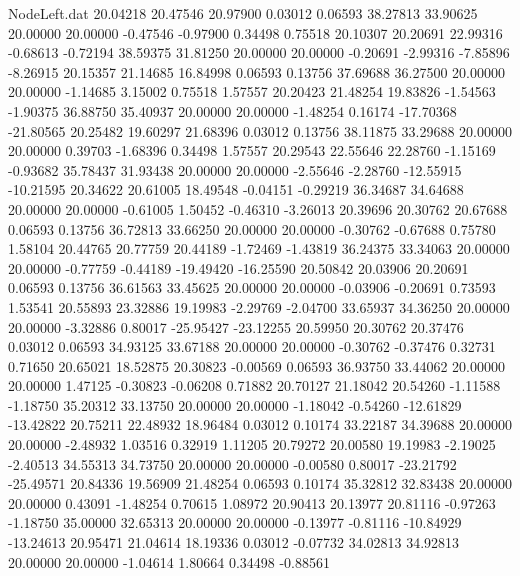 \begin{filecontents}{NodeLeft.dat}
  20.04218   20.47546   20.97900     0.03012    0.06593   38.27813   33.90625   20.00000   20.00000   -0.47546   -0.97900    0.34498    0.75518
  20.10307   20.20691   22.99316    -0.68613   -0.72194   38.59375   31.81250   20.00000   20.00000   -0.20691   -2.99316   -7.85896   -8.26915
  20.15357   21.14685   16.84998     0.06593    0.13756   37.69688   36.27500   20.00000   20.00000   -1.14685    3.15002    0.75518    1.57557
  20.20423   21.48254   19.83826    -1.54563   -1.90375   36.88750   35.40937   20.00000   20.00000   -1.48254    0.16174  -17.70368  -21.80565
  20.25482   19.60297   21.68396     0.03012    0.13756   38.11875   33.29688   20.00000   20.00000    0.39703   -1.68396    0.34498    1.57557
  20.29543   22.55646   22.28760    -1.15169   -0.93682   35.78437   31.93438   20.00000   20.00000   -2.55646   -2.28760  -12.55915  -10.21595
  20.34622   20.61005   18.49548    -0.04151   -0.29219   36.34687   34.64688   20.00000   20.00000   -0.61005    1.50452   -0.46310   -3.26013
  20.39696   20.30762   20.67688     0.06593    0.13756   36.72813   33.66250   20.00000   20.00000   -0.30762   -0.67688    0.75780    1.58104
  20.44765   20.77759   20.44189    -1.72469   -1.43819   36.24375   33.34063   20.00000   20.00000   -0.77759   -0.44189  -19.49420  -16.25590
  20.50842   20.03906   20.20691     0.06593    0.13756   36.61563   33.45625   20.00000   20.00000   -0.03906   -0.20691    0.73593    1.53541
  20.55893   23.32886   19.19983    -2.29769   -2.04700   33.65937   34.36250   20.00000   20.00000   -3.32886    0.80017  -25.95427  -23.12255
  20.59950   20.30762   20.37476     0.03012    0.06593   34.93125   33.67188   20.00000   20.00000   -0.30762   -0.37476    0.32731    0.71650
  20.65021   18.52875   20.30823    -0.00569    0.06593   36.93750   33.44062   20.00000   20.00000    1.47125   -0.30823   -0.06208    0.71882
  20.70127   21.18042   20.54260    -1.11588   -1.18750   35.20312   33.13750   20.00000   20.00000   -1.18042   -0.54260  -12.61829  -13.42822
  20.75211   22.48932   18.96484     0.03012    0.10174   33.22187   34.39688   20.00000   20.00000   -2.48932    1.03516    0.32919    1.11205
  20.79272   20.00580   19.19983    -2.19025   -2.40513   34.55313   34.73750   20.00000   20.00000   -0.00580    0.80017  -23.21792  -25.49571
  20.84336   19.56909   21.48254     0.06593    0.10174   35.32812   32.83438   20.00000   20.00000    0.43091   -1.48254    0.70615    1.08972
  20.90413   20.13977   20.81116    -0.97263   -1.18750   35.00000   32.65313   20.00000   20.00000   -0.13977   -0.81116  -10.84929  -13.24613
  20.95471   21.04614   18.19336     0.03012   -0.07732   34.02813   34.92813   20.00000   20.00000   -1.04614    1.80664    0.34498   -0.88561

\end{filecontents}
